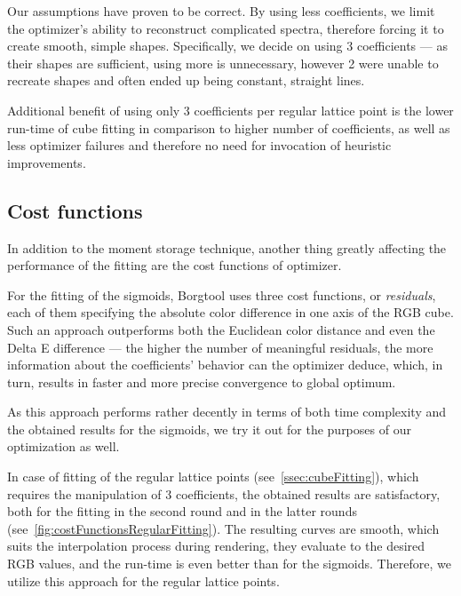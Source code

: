Our assumptions have proven to be correct. By using less coefficients, we limit the optimizer's ability to reconstruct complicated spectra, therefore forcing it to create smooth, simple shapes. Specifically, we decide on using 3 coefficients --- as their shapes are sufficient, using more is unnecessary, however 2 were unable to recreate shapes and often ended up being constant, straight lines.

Additional benefit of using only 3 coefficients per regular lattice point is the lower run-time of cube fitting in comparison to higher number of coefficients, as well as less optimizer failures and therefore no need for invocation of heuristic improvements.

\subsection{Cost functions} \label{ssec:costFunctions}

In addition to the moment storage technique, another thing greatly affecting the performance of the fitting are the cost functions of optimizer.

For the fitting of the sigmoids, Borgtool uses three cost functions, or \emph{residuals}, each of them specifying the absolute color difference in one axis of the RGB cube. Such an approach outperforms both the Euclidean color distance and even the Delta E difference --- the higher the number of meaningful residuals, the more information about the coefficients' behavior can the optimizer deduce, which, in turn, results in faster and more precise convergence to global optimum.

As this approach performs rather decently in terms of both time complexity and the obtained results for the sigmoids, we try it out for the purposes of our optimization as well. 

In case of fitting of the regular lattice points (see~\cref{ssec:cubeFitting}), which requires the manipulation of 3 coefficients, the obtained results are satisfactory, both for the fitting in the second round and in the latter rounds (see~\cref{fig:costFunctionsRegularFitting}). The resulting curves are smooth, which suits the interpolation process during rendering, they evaluate to the desired RGB values, and the run-time is even better than for the sigmoids. Therefore, we utilize this approach for the regular lattice points.


